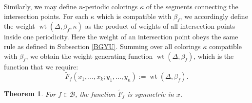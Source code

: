 \documentclass[12pt]{amsart}
\newtheorem{Th}{Theorem}[section]
\def\wt{\operatorname{wt}}
\begin{document}
Similarly, we may define $n$-periodic colorings $\kappa$ of the segments connecting the intersection points. For each $\kappa$ which is compatible with $\beta_f$,  we accordingly define the weight $\wt(\Delta,\beta_f,\kappa)$ as the product of weights of all intersection points inside  one periodicity. Here the weight of an intersection point obeys the same rule as defined in 
Subsection \ref{BGYU}. 
Summing over all colorings $\kappa$ compatible with $\beta_f$, we obtain 
the weight generating function  $\wt(\Delta,\beta_f)$, which is the function  that we require:
$$\tilde{F}_f(x_1,\ldots,x_k;y_1,\ldots,y_n):=\wt(\Delta,\beta_f).$$




\begin{Th}
For $f\in \mathcal{B}$, the function $\tilde{F}_f$ is symmetric in $x$. 
\end{Th}
\end{document}
